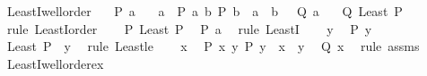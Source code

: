 \begin{isabellebody}
\endisatagproof
{\isafoldproof}%
%
\isadelimproof
\isanewline
%
\endisadelimproof
\isanewline
{}\isamarkupfalse%
\ LeastI{}{\isacharunderscore}{\kern0pt}wellorder{\isacharcolon}{\kern0pt}\isanewline
\ \ \ {\isachardoublequoteopen}P\ a{\isachardoublequoteclose}\isanewline
\ \ \ {\isachardoublequoteopen}{\isasymAnd}a{\isachardot}{\kern0pt}\ {\isasymlbrakk}\ P\ a{\isacharsemicolon}{\kern0pt}\ {\isasymforall}b{\isachardot}{\kern0pt}\ P\ b\ {\isasymlongrightarrow}\ a\ {\isasymle}\ b\ {\isasymrbrakk}\ {\isasymLongrightarrow}\ Q\ a{\isachardoublequoteclose}\isanewline
\ \ \ {\isachardoublequoteopen}Q\ {\isacharparenleft}{\kern0pt}Least\ P{\isacharparenright}{\kern0pt}{\isachardoublequoteclose}\isanewline
%
\isadelimproof
%
\endisadelimproof
%
\isatagproof
{}\isamarkupfalse%
\ {\isacharparenleft}{\kern0pt}rule\ LeastI{}{\isacharunderscore}{\kern0pt}order{\isacharparenright}{\kern0pt}\isanewline
\ \ \isamarkupfalse%
\ {\isachardoublequoteopen}P\ {\isacharparenleft}{\kern0pt}Least\ P{\isacharparenright}{\kern0pt}{\isachardoublequoteclose}\ \isamarkupfalse%
\ {\isacartoucheopen}P\ a{\isacartoucheclose}\ \isamarkupfalse%
\ {\isacharparenleft}{\kern0pt}rule\ LeastI{\isacharparenright}{\kern0pt}\isanewline
{}\isamarkupfalse%
\isanewline
\ \ \isamarkupfalse%
\ y\ \isamarkupfalse%
\ {\isachardoublequoteopen}P\ y{\isachardoublequoteclose}\ \isamarkupfalse%
\ {\isachardoublequoteopen}Least\ P\ {\isasymle}\ y{\isachardoublequoteclose}\ \isamarkupfalse%
\ {\isacharparenleft}{\kern0pt}rule\ Least{\isacharunderscore}{\kern0pt}le{\isacharparenright}{\kern0pt}\isanewline
{}\isamarkupfalse%
\isanewline
\ \ \isamarkupfalse%
\ x\ \isamarkupfalse%
\ {\isachardoublequoteopen}P\ x{\isachardoublequoteclose}\ {\isachardoublequoteopen}{\isasymforall}y{\isachardot}{\kern0pt}\ P\ y\ {\isasymlongrightarrow}\ x\ {\isasymle}\ y{\isachardoublequoteclose}\ \isamarkupfalse%
\ {\isachardoublequoteopen}Q\ x{\isachardoublequoteclose}\ \isamarkupfalse%
\ {\isacharparenleft}{\kern0pt}rule\ assms{\isacharparenleft}{\kern0pt}{}{\isacharparenright}{\kern0pt}{\isacharparenright}{\kern0pt}\isanewline
{}\isamarkupfalse%
%
\endisatagproof
{\isafoldproof}%
%
\isadelimproof
\isanewline
%
\endisadelimproof
\isanewline
{}\isamarkupfalse%
\ LeastI{}{\isacharunderscore}{\kern0pt}wellorder{\isacharunderscore}{\kern0pt}ex{\isacharcolon}{\kern0pt}\isanewline

\end{isabellebody}
